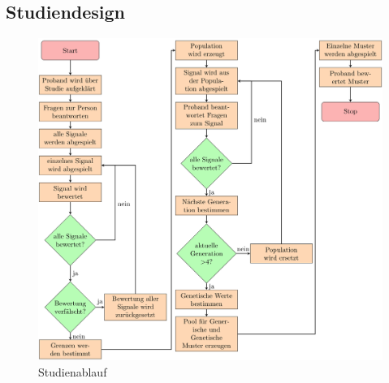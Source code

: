

\subsection{Studiendesign}

\begin{figure}
	\centering
    \includegraphics[width=\textwidth]{pics/analyse/Programmablaufdiagramm.png}
    \caption{Studienablauf}
    \label{fig:flussdiagramm}
\end{figure}

